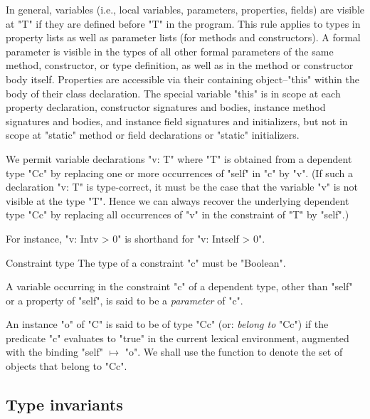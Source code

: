 In general, variables (i.e., local variables, parameters,
properties, fields) are visible at
\xcd"T" if they are defined before \xcd"T" in the program. This rule applies to
types in property lists as well as parameter lists (for methods and
constructors).
A formal parameter is visible in the types of all other formal
parameters of the same method, constructor, or type definition,
as well as in the method or constructor body itself.
Properties are accessible via their containing object--\xcd"this"
within the body of their class declaration.  The special
variable \xcd"this" is in scope at each property
declaration, constructor signatures and bodies, instance method signatures
and bodies,
and instance field signatures and initializers, but not in scope
at \xcd"static" method or field declarations or \xcd"static"
initializers.  

We permit variable declarations \xcd"v: T" where \xcd"T" is obtained
from a dependent type \xcd"C{c}" by replacing one or more occurrences
of \xcd"self" in \xcd"c" by \xcd"v". (If such a declaration \xcd"v: T"
is type-correct, it must be the case that the variable \xcd"v" is not
visible at the type \xcd"T". Hence we can always recover the
underlying dependent type \xcd"C{c}" by replacing all occurrences of \xcd"v"
in the constraint of \xcd"T" by \xcd"self".)

For instance, \xcd"v: Int{v > 0}" is shorthand for \xcd"v: Int{self > 0}".

\begin{staticrule}{Constraint type}
The type of a constraint \xcd"c" must be \xcd"Boolean".  
\end{staticrule}

A variable occurring in the constraint \xcd"c" of a dependent type, other than
\xcd"self" or a property of \xcd"self", is said to be a {\em
parameter} of \xcd"c".\label{DepType:Parameter} 

An instance \xcd"o" of \xcd"C" is said to be of type \xcd"C{c}"
(or: {\em belong to}
\xcd"C{c}") if the predicate \xcd"c" evaluates to \xcd"true" in the current lexical
environment, augmented with the binding \xcd"self" $\mapsto$ \xcd"o". We shall
use the function  to denote the set of
objects that belong to \xcd"C{c}". 

\subsection{Type invariants}\label{DepType:TypeInvariant}
\label{DepType:Guard}


